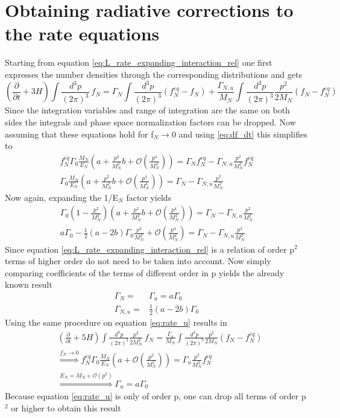 \section{Obtaining radiative corrections to the rate equations}
\label{ap:rad_corrections}
Starting from equation \ref{eq:L_rate_expanding_interaction_rel} one first expresses the number densities through the corresponding distributions and gets
\begin{equation*}
	\left(\frac{\partial}{\partial t}+3H\right)\int\frac{d^3p}{\left(2\pi\right)^3}\:f_N=\Gamma_N\int\frac{d^3p}{\left(2\pi\right)^3}\left(f_N^{eq}-f_N\right)+\frac{\Gamma_{N,u}}{M_N}\int\frac{d^3p}{\left(2\pi\right)^3}\frac{p^2}{2M_N}\left(f_N-f_N^{eq}\right)
\end{equation*}
Since the integration variables and range of integration are the same on both sides the integrals and phase space normalization factors can be dropped. Now assuming that these equations hold for f$_N\rightarrow0$ and using \ref{eq:df_dt} this simplifies to 
\begin{align*}
	f_N^{eq}\Gamma_0\frac{M_N}{E_N}\left(a+\frac{p^2}{M_N^2}b+\mathcal{O}\left(\frac{p^4}{M_N^4}\right)\right)=\Gamma_Nf_N^{eq}-\Gamma_{N,u}\frac{p^2}{M_N^2}f_N^{eq}\\
	\Gamma_0\frac{M_N}{E_N}\left(a+\frac{p^2}{M_N^2}b+\mathcal{O}\left(\frac{p^4}{M_N^4}\right)\right)=\Gamma_N-\Gamma_{N,u}\frac{p^2}{M_N^2}
\end{align*}
Now again, expanding the 1/E$_N$ factor yields
\begin{align*}
	\Gamma_0\left(1-\frac{p^2}{M_N^2}\right)\left(a+\frac{p^2}{M_N^2}b+\mathcal{O}\left(\frac{p^4}{M_N^4}\right)\right)=\Gamma_N-\Gamma_{N,u}\frac{p^2}{M_N^2}\\
	a\Gamma_0-\frac{1}{2}(a-2b)\Gamma_0\frac{p^2}{M_N^2}+\mathcal{O}\left(\frac{p^4}{M_N^4}\right)=\Gamma_N-\Gamma_{N,u}\frac{p^2}{M_N^2}
\end{align*}
Since equation \ref{eq:L_rate_expanding_interaction_rel} is a relation of order p$^2$ terms of higher order do not need to be taken into account. \newline
Now simply comparing coefficients of the terms of different order in p yields the already known result
\begin{align*}
\Gamma_N=&\Gamma_u=a\Gamma_0\\
\Gamma_{N,u}=&\frac{1}{2}(a-2b)\Gamma_0
\end{align*}
Using the same procedure on equation \ref{eq:rate_u} results in 
\begin{align*}
&\left(\frac{\partial}{\partial t}+5H\right)\int\frac{d^3p}{\left(2\pi\right)^3}\frac{p^2}{2M_N^2}\:f_N=\frac{\Gamma_{u}}{M_N}\int\frac{d^3p}{\left(2\pi\right)^3}\frac{p^2}{2M_N}\left(f_N-f_N^{eq}\right)\\
&\overset{f_N\rightarrow0}{\Longrightarrow}f_N^{eq}\Gamma_0\frac{M_N}{E_N}\left(a+\mathcal{O}\left(\frac{p^2}{M_N^2}\right)\right)=\Gamma_{u}\frac{p^2}{M_N^2}f_N^{eq}\\
&\overset{E_N=M_N+\mathcal{O}(p^2)}{\Longrightarrow}\Gamma_u=a\Gamma_0
\end{align*}
Because equation \ref{eq:rate_u} is only of order p, one can drop all terms of order p$^2$ or higher to obtain this result
